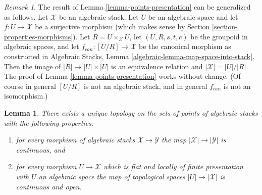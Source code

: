 \documentclass{stacks-project}
\theoremstyle{plain}
\newtheorem{lemma}[subsection]{Lemma}
\theoremstyle{definition}
\theoremstyle{remark}
\newtheorem{remark}[subsection]{Remark}
\numberwithin{equation}{subsection}
\begin{document}
\begin{remark}
\label{remark-more-general-presentation}
The result of
Lemma \ref{lemma-points-presentation}
can be generalized as follows.
Let $\mathcal{X}$ be an algebraic stack.
Let $U$ be an algebraic space and let $f : U \to \mathcal{X}$ be a surjective
morphism (which makes sense by
Section \ref{section-properties-morphisms}).
Let $R = U \times_\mathcal{X} U$, let $(U, R, s, t, c)$ be the groupoid
in algebraic spaces, and let $f_{can} : [U/R] \to \mathcal{X}$ be the
canonical morphism as constructed in
Algebraic Stacks, Lemma \ref{algebraic-lemma-map-space-into-stack}.
Then the image of $|R| \to |U| \times |U|$ is an equivalence relation
and $|\mathcal{X}| = |U|/|R|$. The proof of
Lemma \ref{lemma-points-presentation}
works without change. (Of course in general $[U/R]$ is not an algebraic
stack, and in general $f_{can}$ is not an isomorphism.)
\end{remark}

\begin{lemma}
\label{lemma-topology-points}
There exists a unique topology on the sets of points
of algebraic stacks with the following properties:
\begin{enumerate}
\item for every morphism of algebraic stacks $\mathcal{X} \to \mathcal{Y}$
the map $|\mathcal{X}| \to |\mathcal{Y}|$ is continuous, and
\item for every morphism $U \to \mathcal{X}$ which is flat and locally
of finite presentation with $U$ an algebraic space
the map of topological spaces $|U| \to |\mathcal{X}|$ is continuous and open.
\end{enumerate}
\end{lemma}
\end{document}

